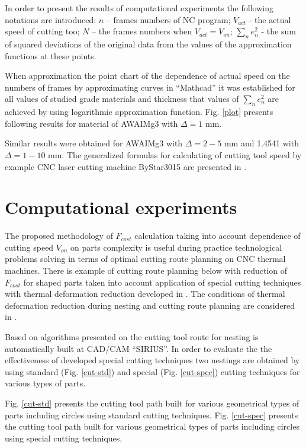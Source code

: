 \documentclass[runningheads]{llncs}
\begin{document}
In order to present the results of computational experiments
the following notations are introduced:
$n$ – frames numbers of NC program;
$V_{act}$ - the actual speed of cutting too;
$N$ – the frames numbers when $V_{act}=V_{on}$;
$\sum_n e_n^2$  - the sum of squared deviations of the
original data from the values of the approximation functions at these points.

When approximation the point chart
of the dependence of actual speed
on the numbers of frames by approximating curves in ``Mathcad''
it was established for all values of studied grade materials
and thickness that values of $\sum_n e_n^2$
are achieved by using logarithmic approximation function.
Fig. \ref{plot} presents following results for material of AWAIMg3 with $\Delta=1$ mm.

Similar results were obtained for AWAIMg3 with $\Delta=2-5$ mm
and 1.4541 with $\Delta=1-10$ mm.
The generalized formulas for calculating of cutting tool speed
by example CNC laser cutting machine ByStar3015 are presented in \cite{ru28}.

\section{Computational experiments}

The proposed methodology of
$F_{cost}$
calculation taking into account dependence of cutting speed
$V_{on}$
on parts complexity is useful during
practice technological problems solving
in terms of optimal cutting route planning on CNC thermal machines.
There is example of cutting route planning below with reduction of
$F_{cost}$
for shaped parts taken into account
application of special cutting techniques
with thermal deformation reduction developed in \cite{ru26}.
The conditions of thermal deformation reduction
during nesting and cutting route planning are considered in \cite{ru01}.

Based on algorithms presented on \cite{ru26}
the cutting tool route for nesting is automatically built at CAD/CAM ``SIRIUS''.
In order to evaluate the the effectiveness of developed special cutting techniques
two nestings are obtained by using standard (Fig. \ref{cut-std})
and special (Fig. \ref{cut-spec})
cutting techniques for various types of parts.

Fig. \ref{cut-std} presents the cutting tool path
built for various geometrical types of parts including circles using standard cutting techniques.
Fig. \ref{cut-spec} presents the cutting tool path built for various geometrical types of parts
including circles using special cutting techniques.
\end{document}
